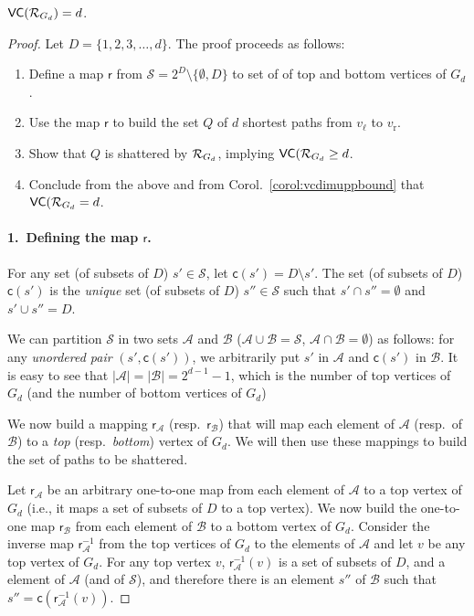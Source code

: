 \begin{lemma}\label{lem:vcdimlowbound}
  $\mathsf{VC}(\mathcal{R}_{G_d})=d$.
\end{lemma}
\ifproof
\begin{proof}
  Let $D=\{1,2,3,\dotsc,d\}$. The proof proceeds as follows: 
  \begin{enumerate}
	  \item Define a map $\mathsf{r}$ from
		  $\mathcal{S}=2^D\setminus\{\emptyset,D\}$ to set of of top and bottom
		  vertices of $G_d$.
	  \item Use the map $\mathsf{r}$ to build the set $Q$ of $d$ shortest paths
		  from $v_\ell$ to $v_\mathrm{r}$.
	  \item Show that $Q$ is shattered by $\mathcal{R}_{G_d}$, implying
		  $\mathsf{VC}(\mathcal{R}_{G_d}\ge d$.
	  \item Conclude from the above and from Corol.~\ref{corol:vcdimuppbound}
	  	  that $\mathsf{VC}(\mathcal{R}_{G_d}=d$.
  \end{enumerate}

  \paragraph{1.~Defining the map $\mathsf{r}$.} For any set (of subsets of
  $D$) $s'\in\mathcal{S}$, let $\mathsf{c}(s')=D\setminus s'$. The set (of
  subsets of $D$) $\mathsf{c}(s')$ is the \emph{unique} set (of subsets of $D$)
  $s''\in\mathcal{S}$ such that $s'\cap s''=\emptyset$ and $s'\cup s''=D$.
  
  We can partition $\mathcal{S}$ in two sets $\mathcal{A}$ and $\mathcal{B}$
  ($\mathcal{A}\cup\mathcal{B}=\mathcal{S}$, $\mathcal{A}\cap
  \mathcal{B}=\emptyset$) as follows: for any \emph{unordered pair}
  $(s',\mathsf{c}(s'))$, we arbitrarily put $s'$ in $\mathcal{A}$ and
  $\mathsf{c}(s')$ in $\mathcal{B}$. It is easy to see that
  $|\mathcal{A}|=|\mathcal{B}|=2^{d-1}-1$, which is the number of top vertices
  of $G_d$ (and the number of bottom vertices of $G_d$)

  We now build a mapping $\mathsf{r}_\mathcal{A}$
  (resp.~$\mathsf{r}_\mathcal{B}$) that will map each element of $\mathcal{A}$
  (resp.~of $\mathcal{B}$) to a \emph{top} (resp.~\emph{bottom})
  vertex of $G_d$. We will then use these mappings to build the set of paths to
  be shattered.
  
  Let $\mathsf{r}_\mathcal{A}$ be an arbitrary one-to-one map from each element
  of $\mathcal{A}$ to a top vertex of $G_d$ (i.e., it maps a set of subsets of
  $D$ to a top vertex). We now build the one-to-one map $\mathsf{r}_\mathcal{B}$
  from each element of $\mathcal{B}$ to a bottom vertex of $G_d$. Consider the
  inverse map $\mathsf{r}^{-1}_\mathcal{A}$ from the top vertices of $G_d$ to
  the elements of $\mathcal{A}$ and let $v$ be any top vertex of $G_d$. For any
  top vertex $v$, $\mathsf{r}^{-1}_\mathcal{A}(v)$ is a set of subsets of $D$,
  and a element of $\mathcal{A}$ (and of $\mathcal{S}$), and therefore there is
  an element $s''$ of $\mathcal{B}$ such that
  $s''=\mathsf{c}(\mathsf{r}^{-1}_\mathcal{A}(v))$.
  

\end{proof}
